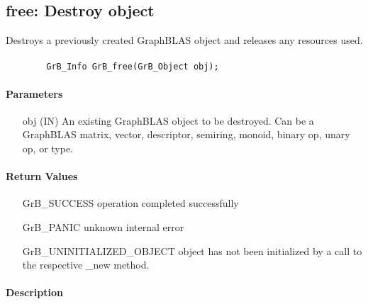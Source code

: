 \subsection{{\sf free}: Destroy object}

Destroys a previously created GraphBLAS object and releases any resources used.

\paragraph{\syntax}

\begin{verbatim}
        GrB_Info GrB_free(GrB_Object obj);
\end{verbatim}


\paragraph{Parameters}

\begin{itemize}[leftmargin=1.1in]
	\item[{\sf obj}] ({\sf IN}) An existing GraphBLAS object to be destroyed. 
    Can be a GraphBLAS matrix, vector, descriptor, semiring, monoid, binary op, 
    unary op, or type.
\end{itemize}

\paragraph{Return Values}

\begin{itemize}[leftmargin=2.1in]
\item[{\sf GrB\_SUCCESS}]        operation completed successfully
\item[{\sf GrB\_PANIC}]          unknown internal error
\item[{\sf GrB\_UNINITIALIZED\_OBJECT}]       object has not been initialized by a call 
                                 to the respective {\sf *\_new} method.
\end{itemize}

\paragraph{Description}


